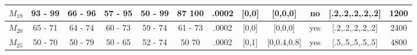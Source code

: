 \begin{table}[H]
{\begin{tabular}{|c|c|c|c|c|c|c|c|c|c|c|c|}
\rowcolor[HTML]{FFFFFF} 
$M_{19}$                                                                             & 93 - 99                                 & 66  - 96                                & 57 - 95                                 & 50 - 99                                 & 87 100                                  & .0002                                                                                   & {[}0,0{]}                                                                                   & {[}0,0,0{]}                                                                                 & no                                                                                        & {[}.2,.2,.2,.2,.2{]}                                                                    & 1200                                                                                      \\ \hline
\rowcolor[HTML]{FFFFFF} 
$M_{20}$                                                                             & 65 - 71                                 & 64 - 74                                 & 60 - 73                                 & 59 - 74                                 & 61 - 73                                 & .0002                                                                                   & {[}0,0{]}                                                                                   & {[}0,0,0{]}                                                                                 & yes                                                                                       & {[}.2,.2,.2,.2,.2{]}                                                                    & 2400                                                                                      \\ \hline
\rowcolor[HTML]{FFFFFF} 
$M_{25}$                                                                             & 50 - 70                                 & 50 - 79                                 & 50 - 65                                 & 52 - 74                                 & 50 70                                   & .0002                                                                                   & {[}0,1{]}                                                                                   & {[}0,0.4,0.8{]}                                                                             & yes                                                                                       & {[}.5,.5,.5,.5,.5{]}                                                                    & 4800                                                                                      \\ \hline

\end{tabular}}
\end{table}
